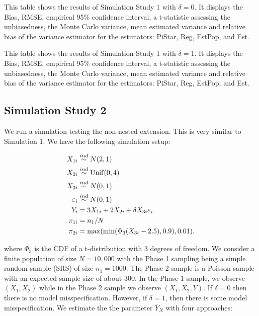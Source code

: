 \documentclass[12pt]{article}
\begin{document}
\begin{table}[ht!]
  \centering
  
\caption{This table shows the results of Simulation Study 1 with $\delta = 0$.
  It displays the Bias, RMSE, empirical 95\% confidence interval, a t-statistic
  assessing the unbiasedness, the Monte Carlo variance, mean estimated variance
  and relative bias of the variance estimator for the estimators: PiStar, Reg,
  EstPop, and Est.}
\label{tab:tpdc0-mean}
\end{table}

\begin{table}[ht!]
  \centering
  
\caption{This table shows the results of Simulation Study 1 with $\delta = 1$.
  It displays the Bias, RMSE, empirical 95\% confidence interval, a t-statistic
  assessing the unbiasedness, the Monte Carlo variance, mean estimated variance
  and relative bias of the variance estimator for the estimators: PiStar, Reg,
  EstPop, and Est.}
\label{tab:tpdc1-mean}
\end{table}

\subsection{Simulation Study 2}

We run a simulation testing the non-nested extension. This is very similar to
Simulation 1. We have the following simulation setup:

$$
\begin{aligned}
X_{1i} &\stackrel{ind}{\sim} N(2, 1) \\
X_{2i} &\stackrel{ind}{\sim} \rm{Unif}(0, 4) \\
X_{3i} &\stackrel{ind}{\sim} N(0, 1) \\
\varepsilon_i &\stackrel{ind}{\sim} N(0, 1) \\
Y_{i} &= 3 X_{1i} + 2 X_{2i} + \delta X_{3i} \varepsilon_i \\
\pi_{1i} &= n_1 / N \\
\pi_{2i} &= \max(\min(\Phi_3(X_{3i} - 2.5), 0.9), 0.01).
\end{aligned}
$$

where $\Phi_3$ is the CDF of a t-distribution with 3 degrees of freedom.
We consider a finite population of size $N = 10,000$ with the Phase 1 
sampling being a simple random sample (SRS) of size $n_1 = 1000$. The Phase 2
sample is a Poisson sample with an expected sample size of about 300.
In the Phase 1 sample, we observe 
$(X_1, X_2)$ while in the Phase 2 sample we observe $(X_1, X_2, Y)$. 
If $\delta = 0$ then there is no model misspecification. However, if $\delta =
1$, then there is some model misspecification. We estimate the
the parameter $\bar Y_N$ with four approaches:
\end{document}
